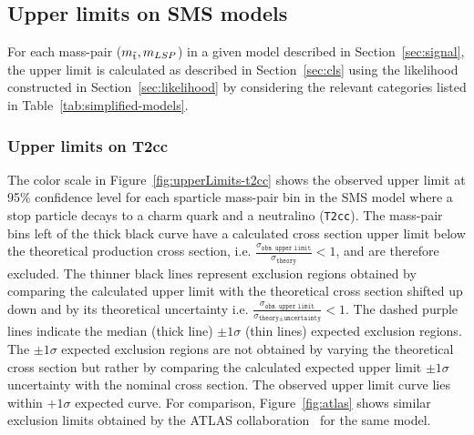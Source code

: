 \subsection{Upper limits on SMS models}
%
For each mass-pair ($m_{\tilde{\rm t}},m_{LSP}$) in a given model described in Section~\ref{sec:signal}, 
the upper limit is calculated as described in Section~\ref{sec:cls} using the likelihood 
constructed in Section~\ref{sec:likelihood} by considering the relevant categories 
listed in Table~\ref{tab:simplified-models}.


\subsubsection{Upper limits on T2cc}
The color scale in Figure~\ref{fig:upperLimits-t2cc} shows the observed upper 
limit at 95\% confidence level for each sparticle mass-pair bin in the SMS 
model where a stop particle decays to a charm quark and a neutralino (\texttt{T2cc}). 
The mass-pair bins left of the thick black curve have a calculated cross 
section upper limit below the theoretical production cross section, 
i.e. $\frac{\sigma_{\texttt{obs. upper limit}}}{\sigma_{\texttt{theory}}} < 1$, and
are therefore excluded. The thinner black lines represent exclusion regions obtained by
comparing the calculated upper limit with the theoretical cross section shifted up down 
and by its theoretical uncertainty i.e. 
$\frac{\sigma_{\texttt{obs. upper limit}}}{\sigma_{\texttt{theory} \pm \texttt{uncertainty}}} < 1$.
The dashed purple lines indicate the median (thick line) $\pm 1 \sigma$ 
(thin lines) expected exclusion regions. The $\pm 1 \sigma$ expected exclusion 
regions are not obtained by varying the theoretical cross section but rather 
by comparing the calculated expected upper limit $\pm 1 \sigma$ uncertainty
with the nominal cross section. The observed upper limit curve lies within
$+1 \sigma$ expected curve. For comparison, Figure~\ref{fig:atlas} shows similar
exclusion limits obtained by the ATLAS collaboration~\cite{Aad:2008zzm} for the same 
model. 

